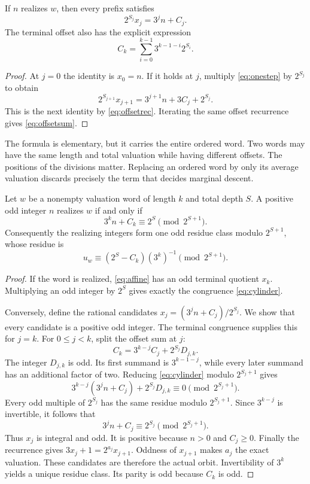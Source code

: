 \begin{theorem}\label{thm:affine}
If $n$ realizes $w$, then every prefix satisfies
\begin{equation}\label{eq:affine}
2^{S_j}x_j=3^j n+C_j.
\end{equation}
The terminal offset also has the explicit expression
\begin{equation}\label{eq:offsetsum}
C_k=\sum_{i=0}^{k-1}3^{k-1-i}2^{S_i}.
\end{equation}
\end{theorem}
\begin{proof}
At $j=0$ the identity is $x_0=n$. If it holds at $j$, multiply \eqref{eq:onestep} by $2^{S_j}$ to obtain
\[
2^{S_{j+1}}x_{j+1}=3^{j+1}n+3C_j+2^{S_j}.
\]
This is the next identity by \eqref{eq:offsetrec}. Iterating the same offset recurrence gives \eqref{eq:offsetsum}.
\end{proof}

The formula is elementary, but it carries the entire ordered word. Two words may have the same length and total valuation while having different offsets. The positions of the divisions matter. Replacing an ordered word by only its average valuation discards precisely the term that decides marginal descent.

\begin{theorem}\label{thm:cylinder}
Let $w$ be a nonempty valuation word of length $k$ and total depth $S$. A positive odd integer $n$ realizes $w$ if and only if
\begin{equation}\label{eq:cylinder}
3^k n+C_k\equiv 2^S\pmod{2^{S+1}}.
\end{equation}
Consequently the realizing integers form one odd residue class modulo $2^{S+1}$, whose residue is
\begin{equation}\label{eq:address}
u_w\equiv(2^S-C_k)(3^k)^{-1}\pmod{2^{S+1}}.
\end{equation}
\end{theorem}
\begin{proof}
If the word is realized, \eqref{eq:affine} has an odd terminal quotient $x_k$. Multiplying an odd integer by $2^S$ gives exactly the congruence \eqref{eq:cylinder}.

Conversely, define the rational candidates $x_j=(3^j n+C_j)/2^{S_j}$. We show that every candidate is a positive odd integer. The terminal congruence supplies this for $j=k$. For $0\le j<k$, split the offset sum at $j$:
\[
C_k=3^{k-j}C_j+2^{S_j}D_{j,k}.
\]
The integer $D_{j,k}$ is odd. Its first summand is $3^{k-1-j}$, while every later summand has an additional factor of two. Reducing \eqref{eq:cylinder} modulo $2^{S_j+1}$ gives
\[
3^{k-j}(3^j n+C_j)+2^{S_j}D_{j,k}\equiv0\pmod{2^{S_j+1}}.
\]
Every odd multiple of $2^{S_j}$ has the same residue modulo $2^{S_j+1}$. Since $3^{k-j}$ is invertible, it follows that
\[
3^j n+C_j\equiv2^{S_j}\pmod{2^{S_j+1}}.
\]
Thus $x_j$ is integral and odd. It is positive because $n>0$ and $C_j\ge0$. Finally the recurrence gives $3x_j+1=2^{a_j}x_{j+1}$. Oddness of $x_{j+1}$ makes $a_j$ the exact valuation. These candidates are therefore the actual orbit. Invertibility of $3^k$ yields a unique residue class. Its parity is odd because $C_k$ is odd.
\end{proof}

